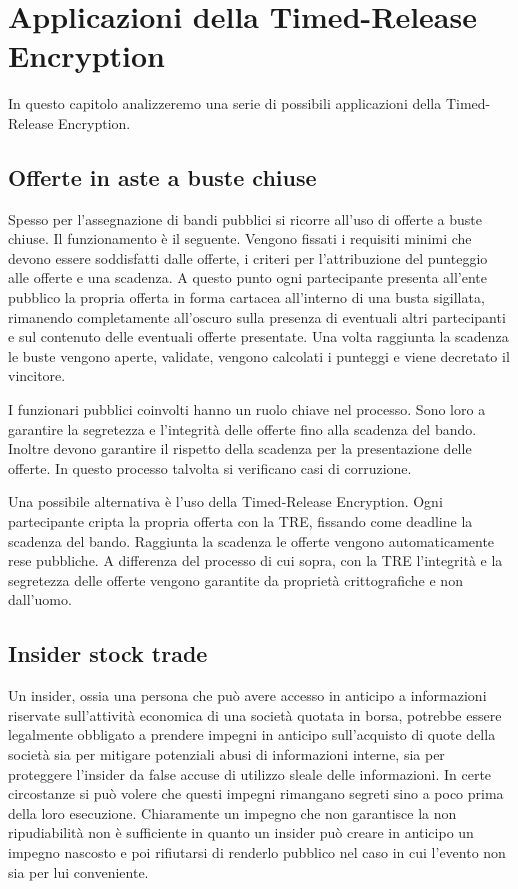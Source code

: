 \chapter{Applicazioni della Timed-Release Encryption}
\label{chap:possibili-usi}

In questo capitolo analizzeremo una serie di possibili
applicazioni della Timed-Release Encryption.

\section{Offerte in aste a buste chiuse}
Spesso per l'assegnazione di bandi pubblici si ricorre all'uso di
offerte a buste chiuse. Il funzionamento è il seguente.
Vengono fissati i requisiti minimi che devono essere soddisfatti
dalle offerte, i criteri per l'attribuzione del punteggio alle offerte e una scadenza.
A questo punto ogni partecipante presenta all'ente pubblico
la propria offerta in forma cartacea
all'interno di una busta sigillata, rimanendo
completamente all'oscuro sulla presenza di eventuali altri partecipanti e sul
contenuto delle eventuali offerte presentate. Una volta raggiunta la scadenza
le buste vengono aperte, validate, vengono calcolati i punteggi
e viene decretato il vincitore.

I funzionari pubblici coinvolti hanno un ruolo chiave nel processo.
Sono loro a garantire la segretezza e l'integrità
delle offerte fino alla scadenza del bando.
Inoltre devono garantire il rispetto della scadenza per la presentazione delle offerte.
In questo processo talvolta si verificano casi di corruzione.

Una possibile alternativa è l'uso della Timed-Release Encryption. Ogni partecipante
cripta la propria offerta con la TRE, fissando come deadline la scadenza del bando.
Raggiunta la scadenza le offerte vengono automaticamente rese pubbliche. A differenza
del processo di cui sopra, con la TRE l'integrità
e la segretezza delle offerte vengono garantite da proprietà crittografiche e non dall'uomo.

\section{Insider stock trade}
Un insider, ossia una persona che può avere accesso in anticipo a informazioni
riservate sull’attività economica di una società quotata in borsa,
potrebbe essere legalmente obbligato a
prendere impegni in anticipo sull'acquisto di quote della società
sia per mitigare potenziali
abusi di informazioni interne, sia per proteggere l'insider da false
accuse di utilizzo sleale delle informazioni.
In certe circostanze
si può volere che questi impegni rimangano segreti sino a poco prima
della loro esecuzione. Chiaramente un impegno che non garantisce la non ripudiabilità
non è sufficiente in quanto un insider può creare in anticipo un impegno nascosto
e poi rifiutarsi di renderlo pubblico nel caso in cui l'evento non sia per lui conveniente.

